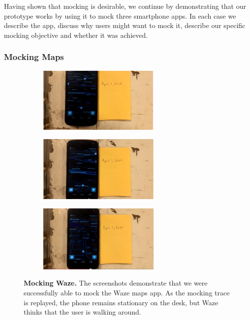 Having shown that mocking is desirable, we continue by demonstrating that our
\PocketMocker{} prototype works by using it to mock three smartphone apps. In
each case we describe the app, discuss why users might want to mock it,
describe our specific mocking objective and whether it was achieved.

\subsubsection{Mocking Maps}

\begin{figure}[t]

\begin{subfigure}[t]{2.33in}
\includegraphics[width=2.33in]{./figures/apps/waze/waze1.png}
\caption{}
\end{subfigure}%
\begin{subfigure}[t]{2.33in}
\includegraphics[width=2.33in]{./figures/apps/waze/waze2.png}
\caption{}
\end{subfigure}%
\begin{subfigure}[t]{2.33in}
\includegraphics[width=2.33in]{./figures/apps/waze/waze3.png}
\caption{}
\end{subfigure}%

\caption{\textbf{Mocking Waze.} The screenshots demonstrate that we were
successfully able to mock the Waze maps app. As the mocking trace is
replayed, the phone remains stationary on the desk, but Waze thinks that the
user is walking around.}

\label{fig-mocking-waze}

\end{figure}

